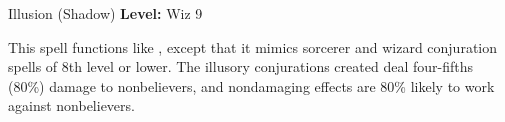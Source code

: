 {Illusion (Shadow)}
{
	\textbf{Level:}
	Wiz 9\\
}
{
	This spell functions like , except that it mimics sorcerer and wizard conjuration spells of 8th level or lower. The illusory conjurations created deal four-fifths (80\%) damage to nonbelievers, and nondamaging effects are 80\% likely to work against nonbelievers.

}
